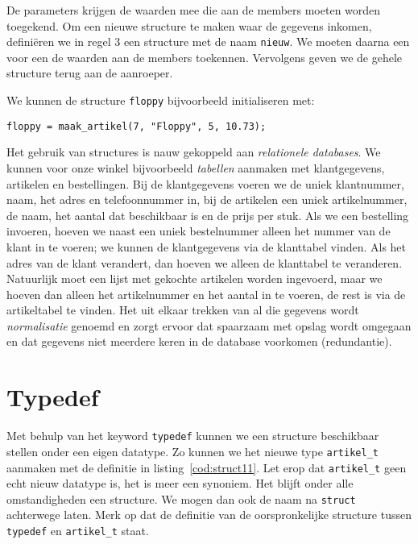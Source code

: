
De parameters krijgen de waarden mee die aan de members moeten worden toegekend. Om een nieuwe structure te maken waar de gegevens inkomen, definiëren we in regel 3 een structure met de naam \texttt{nieuw}. We moeten daarna een voor een de waarden aan de members toekennen. Vervolgens geven we de gehele structure terug aan de aanroeper.

We kunnen de structure \texttt{floppy} bijvoorbeeld initialiseren met:

\hspace*{1em}\texttt{floppy = maak\_artikel(7, "Floppy", 5, 10.73);}


\begin{infobox}
Het gebruik van structures is nauw gekoppeld aan \textsl{relationele databases}. We kunnen voor onze winkel bijvoorbeeld \textsl{tabellen} aanmaken met klantgegevens, artikelen en bestellingen. Bij de klantgegevens voeren we de uniek klantnummer, naam, het adres en telefoonnummer in, bij de artikelen een uniek artikelnummer, de naam, het aantal dat beschikbaar is en de prijs per stuk. Als we een bestelling invoeren, hoeven we naast een uniek bestelnummer alleen het nummer van de klant in te voeren; we kunnen de klantgegevens via de klanttabel vinden. Als het adres van de klant verandert, dan hoeven we alleen de klanttabel te veranderen. Natuurlijk moet een lijst met gekochte artikelen worden ingevoerd, maar we hoeven dan alleen het artikelnummer en het aantal in te voeren, de rest is via de artikeltabel te vinden. Het uit elkaar trekken van al die gegevens wordt \textsl{normalisatie} genoemd en zorgt ervoor dat spaarzaam met opslag wordt omgegaan en dat gegevens niet meerdere keren in de database voorkomen (redundantie).
\end{infobox}



\section{Typedef}
Met behulp van het keyword \texttt{typedef} kunnen we een structure beschikbaar stellen onder een eigen datatype. Zo kunnen we het nieuwe type \texttt{artikel\_t} aanmaken met de definitie in listing~\ref{cod:struct11}. Let erop dat \texttt{artikel\_t} geen echt nieuw datatype is, het is meer een synoniem. Het blijft onder alle omstandigheden een structure. We mogen dan ook de naam na \texttt{struct} achterwege laten. Merk op dat de definitie van de oorspronkelijke structure tussen \texttt{typedef} en \texttt{artikel\_t} staat.

